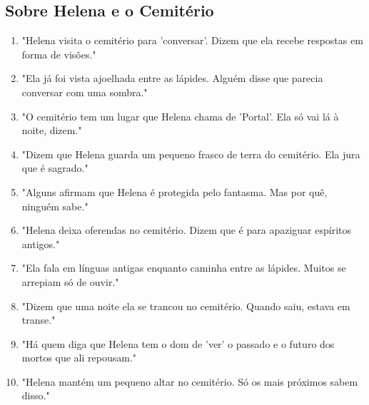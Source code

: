 \subsection*{Sobre Helena e o Cemitério}
\begin{enumerate}
    \item "Helena visita o cemitério para 'conversar'. Dizem que ela recebe respostas em forma de visões."
    \item "Ela já foi vista ajoelhada entre as lápides. Alguém disse que parecia conversar com uma sombra."
    \item "O cemitério tem um lugar que Helena chama de 'Portal'. Ela só vai lá à noite, dizem."
    \item "Dizem que Helena guarda um pequeno frasco de terra do cemitério. Ela jura que é sagrado."
    \item "Alguns afirmam que Helena é protegida pelo fantasma. Mas por quê, ninguém sabe."
    \item "Helena deixa oferendas no cemitério. Dizem que é para apaziguar espíritos antigos."
    \item "Ela fala em línguas antigas enquanto caminha entre as lápides. Muitos se arrepiam só de ouvir."
    \item "Dizem que uma noite ela se trancou no cemitério. Quando saiu, estava em transe."
    \item "Há quem diga que Helena tem o dom de 'ver' o passado e o futuro dos mortos que ali repousam."
    \item "Helena mantém um pequeno altar no cemitério. Só os mais próximos sabem disso."
\end{enumerate}

